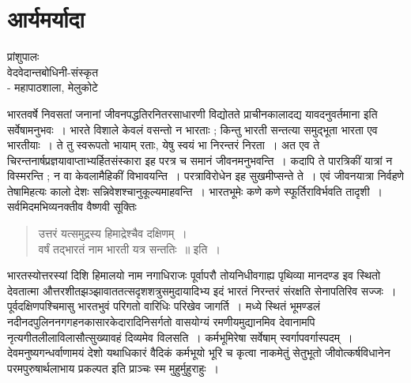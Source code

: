 {\fontsize{15}{17}\selectfont
\chapter{आर्यमर्यादा}

\begin{center}
\smallskip

प्रांशुपालः\\
वेदवेदान्तबोधिनी-संस्कृत\\
- महापाठशाला, मेलुकोटे
\addrule
\end{center}

भारतवर्षे निवसतां जनानां जीवनपद्धतिरनितरसाधारणी विद्योतते प्राचीनकालादद्य यावदनुवर्तमाना इति सर्वेषामनुभवः~। भारते विशाले केवलं वसन्तो न भारताः ; किन्तु भारती सन्तत्या समुद्भूता भारता एव भारतीयाः~। ते तु स्वरूपतो भायाम् रताः, येषु स्वयं भा निरन्तरं निरता~। अत एव ते चिरन्तनार्षप्रज्ञयावाप्ताभ्यर्हितसंस्कारा इह परत्र च समानं जीवनमनुभवन्ति~। कदापि ते पारत्रिकीं यात्रां न विस्मरन्ति ; न वा केवलामैहिकीं विभावयन्ति~। परत्राविरोधेन इह सुखमीप्सन्ते ते~। एवं जीवनयात्रा निर्वहणे तेषामिहत्यः कालो देशः सन्निवेशश्चानुकूल्यमाहवन्ति~। भारतभूमेः कणे कणे स्फूर्तिराविर्भवति तादृशी~। सर्वमिदमभिव्यनक्तीव वैष्णवी सूक्तिः 
\begin{verse}
उत्तरं यत्समुद्रस्य हिमाद्रेश्चैव दक्षिणम्~। \\
वर्षं तद्भारतं नाम भारती यत्र सन्ततिः~॥ इति~। 
\end{verse}
भारतस्योत्तरस्यां दिशि हिमालयो नाम नगाधिराजः पूर्वापरौ तोयनिधीवगाह्य पृथिव्या मानदण्ड इव स्थितो देवतात्मा औत्तरशीतझञ्झावाततत्सदृशशत्रुसमुदायादिभ्य इदं भारतं निरन्तरं संरक्षति सेनापतिरिव सज्जः~। पूर्वदक्षिणपश्चिमासु भारतभुवं परिगतो वारिधिः परिखेव जागर्ति~। मध्ये स्थितं  भूमण्डलं नदीनदपुलिननगगहनकासारकेदारादिनिसर्गतो वासयोग्यं रमणीयमुद्यानमिव देवानामपि नृत्यगीतलीलाविलासौत्सुख्यावहं दिव्यमेव विलसति~। कर्मभूमिरेषा सर्वेषाम् स्वर्गापवर्गास्पदम्~। देवमनुष्यगन्धर्वाणामयं देशो यथाधिकारं वैदिकं कर्मभूयो भूरि च कृत्वा नाकमेतुं सेतुभूतो जीवोत्कर्षविधानेन परमपुरुषार्थलाभाय प्रकल्पत इति प्राञ्चः स्म मुहुर्मुहुराहुः~। 

}
